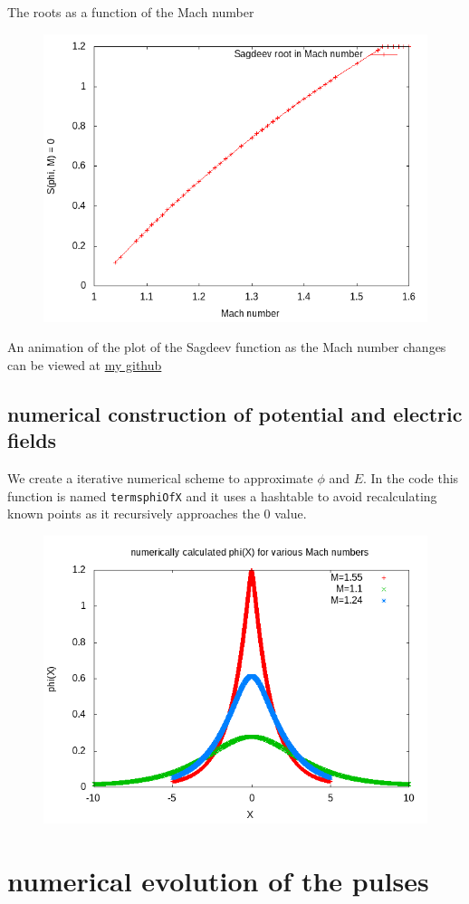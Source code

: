 \documentclass{article}
\begin{document}
The roots as a function of the Mach number
\begin{figure}
\includegraphics{sagdeevroots.png}
\end{figure}
An animation of the plot of the Sagdeev function as the Mach number changes can be viewed at 
\href{https://github.com/ramrunner/mhd-lisp/blob/master/doc/anim.gif}{my github}

\subsection{numerical construction of potential and electric fields}
We create a iterative numerical scheme to approximate $\phi$ and $E$. In the code this 
function is named {\tt termsphiOfX} and it uses a hashtable to avoid recalculating known points
as it recursively approaches the 0 value.
\begin{figure}
\includegraphics{phiofxvarm.png}
\end{figure}

\section{numerical evolution of the pulses}
\end{document}
